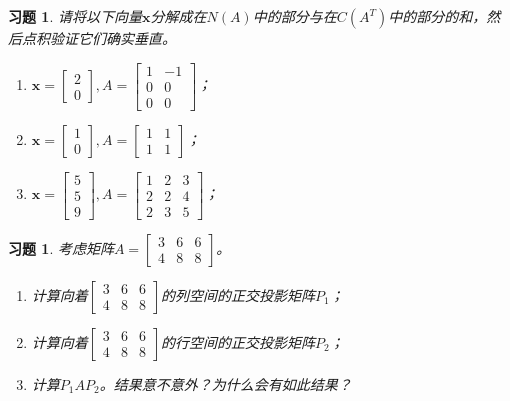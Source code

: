 \documentclass[UTF8]{ctexart}
\newcommand{\Ker}{N}
\newtheorem{ex}[thm]{习题}
\begin{document}
\begin{ex}
请将以下向量$\bm x$分解成在$\Ker(A)$中的部分与在$C(A^{T})$中的部分的和，然后点积验证它们确实垂直。
\begin{enumerate}
\item $\bm x=\begin{bmatrix}2\\0\end{bmatrix},A=\begin{bmatrix}1&-1\\0&0\\0&0\end{bmatrix}$；
\item $\bm x=\begin{bmatrix}1\\0\end{bmatrix},A=\begin{bmatrix}1&1\\1&1\end{bmatrix}$；
\item $\bm x=\begin{bmatrix}5\\5\\9\end{bmatrix},A=\begin{bmatrix}1&2&3\\2&2&4\\2&3&5\end{bmatrix}$；
\end{enumerate}
\end{ex}



\begin{ex}
考虑矩阵$A=\begin{bmatrix}3&6&6\\4&8&8\end{bmatrix}$。
\begin{enumerate}
\item 计算向着$\begin{bmatrix}3&6&6\\4&8&8\end{bmatrix}$的列空间的正交投影矩阵$P_1$；
\item 计算向着$\begin{bmatrix}3&6&6\\4&8&8\end{bmatrix}$的行空间的正交投影矩阵$P_2$；
\item 计算$P_1AP_2$。结果意不意外？为什么会有如此结果？
\end{enumerate}
\end{ex}
\end{document}

